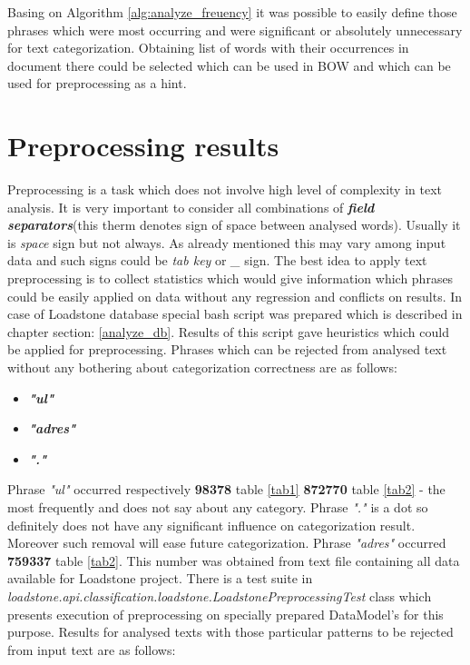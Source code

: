 Basing on Algorithm \ref{alg:analyze_freuency} it was possible to easily define those phrases which were most occurring and were significant or absolutely unnecessary for text categorization. Obtaining list of words with their occurrences in document there could be selected which can be used in BOW and which can be used for preprocessing as a hint.

\section{Preprocessing results}
Preprocessing is a task which does not involve high level of complexity in text analysis. It is very important to consider all combinations of \textit{\textbf{field separators}}(this therm denotes sign of space between analysed words). Usually it is \textit{space} sign but not always. As already mentioned this may vary among input data and such signs could be \textit{tab key} or \textit{\_} sign. The best idea to apply text preprocessing is to collect statistics which would give information which phrases could be easily applied on data without any regression and conflicts on results. In case of Loadstone database special bash script was prepared which is described in chapter section: \ref{analyze_db}. Results of this script gave heuristics which could be applied for preprocessing.
Phrases which can be rejected from analysed text without any bothering about categorization correctness are as follows:
\newline
\begin{itemize}
	\item \textbf{\textit{"ul"}}
	\item \textbf{\textit{"adres"}}
	\item \textbf{\textit{"."}}
\end{itemize}
Phrase \textit{"ul"} occurred respectively \textbf{98378} table \ref{tab1} \textbf{872770} table \ref{tab2} - the most frequently and does not say about any category. Phrase \textit{"."} is a dot so definitely does not have any significant influence on categorization result. Moreover such removal will ease future categorization. Phrase \textit{"adres"} occurred \textbf{759337} table \ref{tab2}. This number was obtained from text file containing all data available for Loadstone project. There is a test suite in \textit{loadstone.api.classification.loadstone.LoadstonePreprocessingTest} class which presents execution of preprocessing on specially prepared DataModel's for this purpose. Results for analysed texts with those particular patterns to be rejected from input text are as follows:

